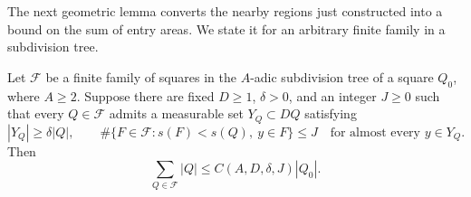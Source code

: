 The next geometric lemma converts the nearby regions just constructed
into a bound on the sum of entry areas. We state it for an arbitrary
finite family in a subdivision tree.

\begin{lemma}
\label{lem:packing}
Let $\mathcal F$ be a finite family of squares in the $A$-adic
subdivision tree of a square $Q_0$, where $A\ge2$. Suppose there are
fixed $D\ge1$, $\delta>0$, and an integer $J\ge0$ such that every
$Q\in\mathcal F$ admits a measurable set $Y_Q\subset DQ$ satisfying
\[
 |Y_Q|\ge\delta|Q|,
 \qquad
 \#\{F\in\mathcal F:s(F)<s(Q),\ y\in F\}\le J
 \quad\text{for almost every }y\in Y_Q.
\]
Then
\begin{equation}
\label{eq:packing}
 \sum_{Q\in\mathcal F}|Q|
 \le C(A,D,\delta,J)|Q_0|.
\end{equation}
\end{lemma}

